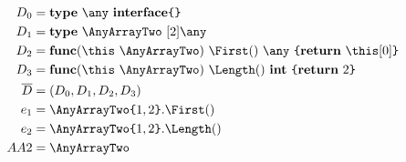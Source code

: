 
\begin{align*}
    D_0    & = \type~\any~\interface\br{}                                       \\
    D_1    & = \type~\AnyArrayTwo~[2]\any                                       \\
    D_2    & = \func (\this~\AnyArrayTwo)~\First()~\any~\br{ \return~\this[0] } \\
    D_3    & = \func (\this~\AnyArrayTwo)~\Length()~\kw{int}~\br{ \return~2 }   \\
    \ov{D} & = (D_0, D_1, D_2, D_3)                                             \\
    e_1    & = \AnyArrayTwo\br{1, 2}.\First()                                   \\
    e_2    & = \AnyArrayTwo\br{1, 2}.\Length()                                  \\
    AA2    & = \AnyArrayTwo
\end{align*}

